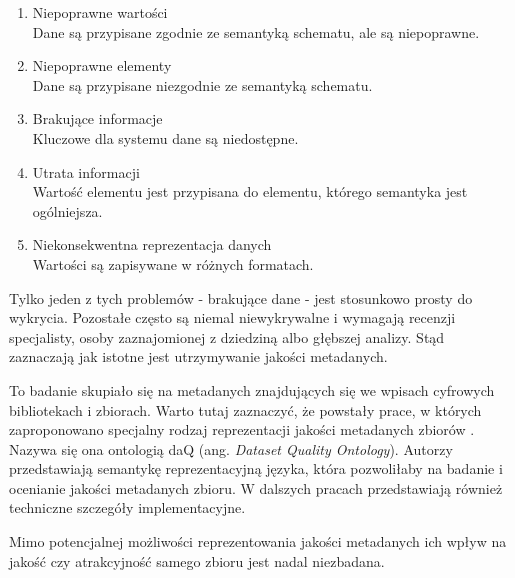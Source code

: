 	\begin{enumerate}
		\item Niepoprawne wartości \\
		Dane są przypisane zgodnie ze semantyką schematu, ale są niepoprawne.

		\item Niepoprawne elementy \\
		Dane są przypisane niezgodnie ze semantyką schematu.

		\item Brakujące informacje \\
		Kluczowe dla systemu dane są niedostępne.

		\item Utrata informacji \\
		Wartość elementu jest przypisana do elementu, którego semantyka jest ogólniejsza.

		\item Niekonsekwentna reprezentacja danych \\
		Wartości są zapisywane w różnych formatach.
	\end{enumerate}

	Tylko jeden z tych problemów - brakujące dane - jest stosunkowo prosty do wykrycia.
	Pozostałe często są niemal niewykrywalne i wymagają recenzji specjalisty, osoby zaznajomionej z dziedziną albo głębszej analizy.
	Stąd zaznaczają jak istotne jest utrzymywanie jakości metadanych.

	To badanie skupiało się na metadanych znajdujących się we wpisach cyfrowych bibliotekach i zbiorach.
	Warto tutaj zaznaczyć, że powstały prace, w których zaproponowano specjalny rodzaj reprezentacji jakości metadanych zbiorów \cite{debattista2014daq}.
	Nazywa się ona ontologią daQ (ang. \emph{Dataset Quality Ontology}).
	Autorzy przedstawiają semantykę reprezentacyjną języka, która pozwoliłaby na badanie i ocenianie jakości metadanych zbioru.
	W dalszych pracach \cite{debattista2014representing} przedstawiają również techniczne szczegóły implementacyjne.

	Mimo potencjalnej możliwości reprezentowania jakości metadanych ich wpływ na jakość czy atrakcyjność samego zbioru jest nadal niezbadana.
